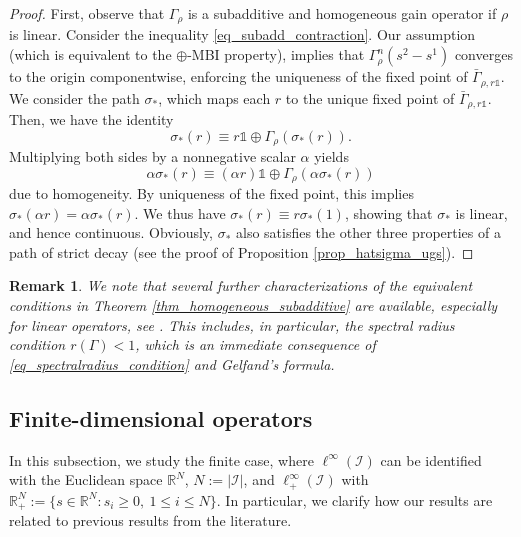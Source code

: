 \documentclass[10pt, oneside, a4paper]{article}
\newcommand{\R}{\mathbb{R}}
\newcommand{\unit}{\mathds{1}}
\newcommand{\IC}{\mathcal{I}}
\newcommand{\bsign}[1]{\bar{#1}}
\newtheorem{remark}{Remark}[section]
\begin{document}
\begin{proof}
First, observe that $\Gamma_{\rho}$ is a subadditive and homogeneous gain operator if $\rho$ is linear. Consider the inequality \eqref{eq_subadd_contraction}. Our assumption (which is equivalent to the $\oplus$-MBI property), implies that $\Gamma_{\rho}^n(s^2 - s^1)$ converges to the origin componentwise, enforcing the uniqueness of the fixed point of $\bsign{\Gamma}_{\rho,r\unit}$. We consider the path $\sigma_*$, which maps each $r$ to the unique fixed point of $\bsign{\Gamma}_{\rho,r\unit}$. Then, we have the identity%
\begin{equation*}
  \sigma_*(r) \equiv r\unit \oplus \Gamma_{\rho}(\sigma_*(r)).%
\end{equation*}
Multiplying both sides by a nonnegative scalar $\alpha$ yields%
\begin{equation*}
  \alpha\sigma_*(r) \equiv (\alpha r)\unit \oplus \Gamma_{\rho}(\alpha\sigma_*(r))%
\end{equation*}
due to homogeneity. By uniqueness of the fixed point, this implies $\sigma_*(\alpha r) = \alpha \sigma_*(r)$. We thus have $\sigma_*(r) \equiv r \sigma_*(1)$, showing that $\sigma_*$ is linear, and hence continuous. Obviously, $\sigma_*$ also satisfies the other three properties of a path of strict decay (see the proof of Proposition \ref{prop_hatsigma_ugs}).
\end{proof}

\begin{remark}
We note that several further characterizations of the equivalent conditions in Theorem \ref{thm_homogeneous_subadditive} are available, especially for linear operators, see \cite{GMi}. This includes, in particular, the spectral radius condition $r(\Gamma) < 1$, which is an immediate consequence of \eqref{eq_spectralradius_condition} and Gelfand's formula.
\end{remark}

\subsection{Finite-dimensional operators}\label{subsec_finite_case}

In this subsection, we study the finite case, where $\ell^{\infty}(\IC)$ can be identified with the Euclidean space $\R^N$, $N := |\IC|$, and $\ell^{\infty}_+(\IC)$ with $\R^N_+ := \{ s \in \R^N : s_i \geq 0,\ 1 \leq i \leq N\}$. In particular, we clarify how our results are related to previous results from the literature.%
\end{document}
